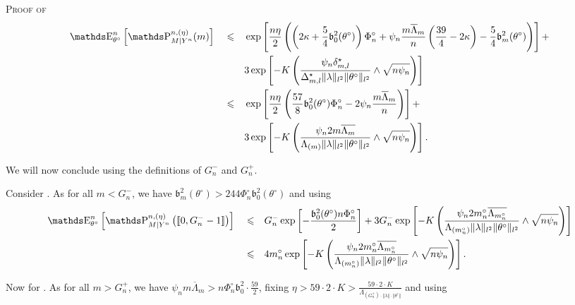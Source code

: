 \begin{pro}{\textsc{Proof of } \\}
\begin{alignat}{3}
& \E_{\theta^{\circ}}^{n}\left[\P_{M \vert Y^{n}}^{n, (\eta)}(m)\right] && \leq && \exp\left[\frac{n \eta}{2}\left(\left(2 \kappa + \frac{5}{4} \mathfrak{b}_{0}^{2}(\theta^{\circ})\right) \Phi^{\circ}_{n} + \psi_{n} \frac{m \overline{\Lambda}_{m}}{n}\left(\frac{39}{4} - 2 \kappa \right) - \frac{5}{4} \mathfrak{b}_{m}^{2}(\theta^{\circ})\right)\right] +\notag\\
& && && 3 \exp\left[ -K \left(\frac{\psi_{n} \delta^{\star}_{m, l}}{\Delta^{\star}_{m, l} \Vert \lambda \Vert_{l^{2}} \Vert \theta^{\circ} \Vert_{l^{2}}} \wedge \sqrt{n \psi_{n}} \right)\right]\notag\\
& && \leq && \exp\left[\frac{n \eta}{2}\left(\frac{57}{8} \mathfrak{b}_{0}^{2}(\theta^{\circ}) \Phi^{\circ}_{n} - 2 \psi_{n} \frac{m \overline{\Lambda}_{m}}{n}\right)\right] +\notag\\
& && && 3 \exp\left[ -K \left(\frac{\psi_{n} 2 m\overline{\Lambda_{m}}}{\Lambda_{(m)} \Vert \lambda \Vert_{l^{2}} \Vert \theta^{\circ} \Vert_{l^{2}}} \wedge \sqrt{n \psi_{n}} \right)\right]\label{EQD.25}.
\end{alignat}

\bigskip

We will now conclude using the definitions of $G^{-}_{n}$ and $G^{+}_{n}$.

Consider .
As for all $m < G^{-}_{n}$, we have $\mathfrak{b}_{m}^{2}(\theta^{\circ}) > 244 \Phi^{\circ}_{n} \mathfrak{b}_{0}^{2}(\theta^{\circ})$ and using 
\begin{alignat*}{3}
& \E_{\theta^{\circ}}^{n}\left[\P_{M \vert Y^{n}}^{n, (\eta)}\left(\llbracket 0, G^{-}_{n} - 1 \rrbracket\right)\right] && \leq && G^{-}_{n} \exp\left[- \frac{\mathfrak{b}_{0}^{2}(\theta^{\circ}) n \Phi^{\circ}_{n}}{2} \right] + 3 G^{-}_{n} \exp\left[ -K \left(\frac{\psi_{n} 2 m^{\circ}_{n}\overline{\Lambda_{m^{\circ}_{n}}}}{\Lambda_{(m^{\circ}_{n})} \Vert \lambda \Vert_{l^{2}} \Vert \theta^{\circ} \Vert_{l^{2}}} \wedge \sqrt{n \psi_{n}} \right)\right]\\
& && \leq && 4 m^{\circ}_{n} \exp\left[ -K \left(\frac{\psi_{n} 2 m^{\circ}_{n}\overline{\Lambda_{m^{\circ}_{n}}}}{\Lambda_{(m^{\circ}_{n})} \Vert \lambda \Vert_{l^{2}} \Vert \theta^{\circ} \Vert_{l^{2}}} \wedge \sqrt{n \psi_{n}} \right)\right].
\end{alignat*}

Now for .
As for all $m > G^{+}_{n}$, we have $\psi_{n} m \overline{\Lambda}_{m} > n \Phi^{\circ}_{n} \mathfrak{b}_{0}^{2} \cdot \frac{59}{2}$, fixing $\eta > 59 \cdot 2 \cdot K > \frac{59 \cdot 2 \cdot K}{\Lambda_{(G^{+}_{n}) \cdot \left\Vert \lambda \right\Vert \cdot \left\Vert \theta^{\circ} \right\Vert}}$ and using 


\end{pro}
